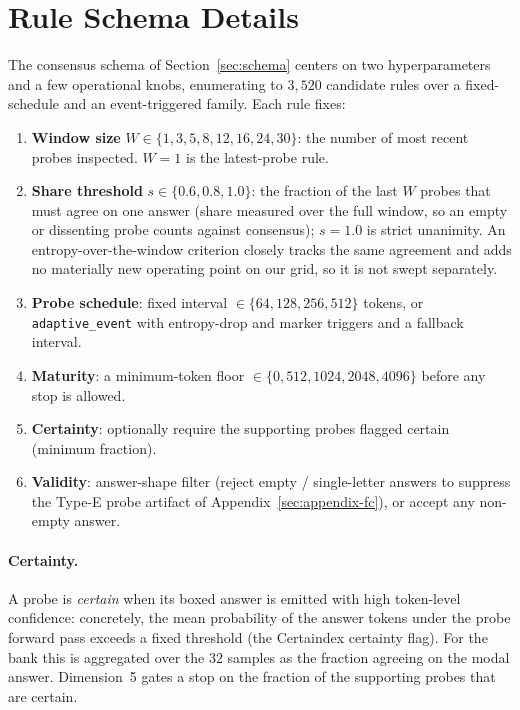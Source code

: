 \section{Rule Schema Details}
\label{sec:appendix-schema}

The consensus schema of Section~\ref{sec:schema} centers on two hyperparameters
and a few operational knobs, enumerating to $3{,}520$ candidate rules over a
fixed-schedule and an event-triggered family. Each rule fixes:
\begin{enumerate}
  \item \textbf{Window size} $W\in\{1,3,5,8,12,16,24,30\}$: the number of most
  recent probes inspected. $W{=}1$ is the latest-probe rule.
  \item \textbf{Share threshold} $s\in\{0.6,0.8,1.0\}$: the fraction of the last
  $W$ probes that must agree on one answer (share measured over the full window,
  so an empty or dissenting probe counts against consensus); $s{=}1.0$ is strict
  unanimity. An entropy-over-the-window criterion closely tracks the same
  agreement and adds no materially new operating point on our grid, so it is not
  swept separately.
  \item \textbf{Probe schedule}: fixed interval $\in\{64,128,256,512\}$ tokens,
  or \texttt{adaptive\_event} with entropy-drop and marker triggers and a
  fallback interval.
  \item \textbf{Maturity}: a minimum-token floor $\in\{0,512,1024,2048,4096\}$
  before any stop is allowed.
  \item \textbf{Certainty}: optionally require the supporting probes flagged
  certain (minimum fraction).
  \item \textbf{Validity}: answer-shape filter (reject empty / single-letter
  answers to suppress the Type-E probe artifact of
  Appendix~\ref{sec:appendix-fc}), or accept any non-empty answer.
\end{enumerate}

\paragraph{Certainty.}
A probe is \emph{certain} when its boxed answer is emitted with high token-level
confidence: concretely, the mean probability of the answer tokens under the
probe forward pass exceeds a fixed threshold (the Certaindex certainty flag).
For the \simplek{} bank this is aggregated over the $32$ samples as the fraction
agreeing on the modal answer. Dimension~5 gates a stop on the fraction of the
supporting probes that are certain.

